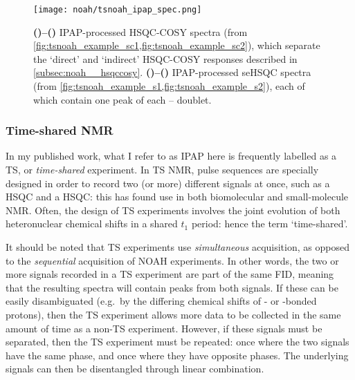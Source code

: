 \begin{figure}[!ht]
    \centering
    \texttt{[image: noah/tsnoah\_ipap\_spec.png]}%
    {\label{fig:tsnoah_ipap_spec_sc_direct}}%
    {\label{fig:tsnoah_ipap_spec_sc_indirect}}%
    {\label{fig:tsnoah_ipap_spec_s_alpha}}%
    {\label{fig:tsnoah_ipap_spec_s_beta}}%
    \caption[IPAP processed spectra from NOAH-8 supersequence]{
        \textbf{()--()} IPAP-processed HSQC-COSY spectra (from \cref{fig:tsnoah_example_sc1,fig:tsnoah_example_sc2}), which separate the `direct' and `indirect' HSQC-COSY responses described in \cref{subsec:noah__hsqccosy}.
        \textbf{()--()} IPAP-processed seHSQC spectra (from \cref{fig:tsnoah_example_s1,fig:tsnoah_example_s2}), each of which contain one peak of each \proton{}--\carbon{} doublet.
    }
    \label{fig:tsnoah_ipap_spec}
\end{figure}

\subsubsection{Time-shared NMR}

In my published work\autocite{Kupce2021JACSA}, what I refer to as IPAP here is frequently labelled as a TS, or \textit{time-shared} experiment.
In TS NMR, pulse sequences are specially designed in order to record two (or more) different signals at once, such as a \carbon{} HSQC and a \nitrogen{} HSQC: this has found use in both biomolecular\autocite{Farmer1991JMR,Boelens1994JBNMR,Pascal1994JMRSB,Sattler1995JBNMR,Frueh2009JBNMR,Lohr2014JMR} and small-molecule NMR\autocite{Nolis2006MRC,PerezTrujillo2007OL,Nolis2007ACIE,Parella2010CMR}.
Often, the design of TS experiments involves the joint evolution of both heteronuclear chemical shifts in a shared $t_1$ period: hence the term `time-shared'.

It should be noted that TS experiments use \textit{simultaneous} acquisition, as opposed to the \textit{sequential} acquisition of NOAH experiments.
In other words, the two or more signals recorded in a TS experiment are part of the same FID, meaning that the resulting spectra will contain peaks from both signals.
If these can be easily disambiguated (e.g.\ by the differing chemical shifts of \carbon{}- or \nitrogen{}-bonded protons), then the TS experiment allows more data to be collected in the same amount of time as a non-TS experiment.
However, if these signals must be separated, then the TS experiment must be repeated: once where the two signals have the same phase, and once where they have opposite phases.
The underlying signals can then be disentangled through linear combination.\autocite{Sorensen1990JMR,Farmer1991JMR}

